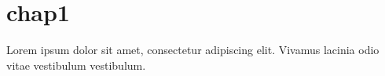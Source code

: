 \section{chap1}
Lorem ipsum dolor sit amet, consectetur adipiscing elit. Vivamus lacinia odio vitae vestibulum vestibulum.